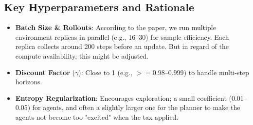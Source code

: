 \subsection{Key Hyperparameters and Rationale}

\begin{itemize}
    \item \textbf{Batch Size \& Rollouts}: According to the paper, we run multiple environment replicas in parallel (e.g., 16–30) for sample efficiency. Each replica collects around 200 steps before an update. But in regard of the compute availability, this might be adjusted.
    \item \textbf{Discount Factor} (\(\gamma\)): Close to 1 (e.g., \(>=0.98\)–\(0.999\)) to handle multi-step horizons.
    \item \textbf{Entropy Regularization}: Encourages exploration; a small coefficient (0.01–0.05) for agents, and often a slightly larger one for the planner to make the agents not become too "excited" when the tax applied.
\end{itemize}


